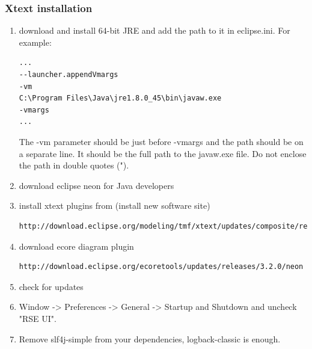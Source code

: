  


\subsubsection{Xtext installation}


\begin{enumerate}
\item download and install 64-bit JRE and add the path to it in eclipse.ini. For example:
\begin{verbatim}
...
--launcher.appendVmargs
-vm
C:\Program Files\Java\jre1.8.0_45\bin\javaw.exe
-vmargs
...
\end{verbatim}
The -vm parameter should be just before -vmargs and the path should be on a separate line. It should be the full path to the javaw.exe file. Do not enclose the path in double quotes (").

\item  download eclipse neon for Java developers
\item  install xtext plugins from (install new software site)
\begin{verbatim}
http://download.eclipse.org/modeling/tmf/xtext/updates/composite/releases/
\end{verbatim}
\item  download ecore diagram plugin
\begin{verbatim}
http://download.eclipse.org/ecoretools/updates/releases/3.2.0/neon
\end{verbatim}
\item check for updates
\item Window -> Preferences -> General -> Startup and Shutdown and uncheck "RSE UI".
\item Remove slf4j-simple from your dependencies, logback-classic is enough.
\end{enumerate}

 



 

 

 
 